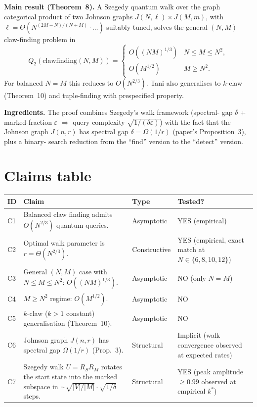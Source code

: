 \documentclass[11pt]{article}
\begin{document}
\textbf{Main result (Theorem~8).} A Szegedy quantum walk over the graph
categorical product of two Johnson graphs $J(N,\ell)\times J(M,m)$, with
$\ell=\Theta(N^{(2M-N)/(N+M)}\cdot\ldots)$ suitably tuned, solves the general
$(N,M)$ claw-finding problem in
\[
Q_2(\mathrm{clawfinding}(N,M))=
\begin{cases}
O((NM)^{1/3}) & N\le M\le N^2,\\
O(M^{1/2}) & M\ge N^2.
\end{cases}
\]
For balanced $N=M$ this reduces to $O(N^{2/3})$. Tani also generalises to
$k$-claw (Theorem~10) and tuple-finding with prespecified property.

\textbf{Ingredients.} The proof combines Szegedy's walk framework (spectral-
gap $\delta$ + marked-fraction $\varepsilon$ $\Rightarrow$ query complexity
$\sqrt{1/(\delta\varepsilon)}$) with the fact that the Johnson graph $J(n,r)$
has spectral gap $\delta=\Omega(1/r)$ (paper's Proposition~3), plus a binary-
search reduction from the ``find'' version to the ``detect'' version.

\section{Claims table}
\begin{tabular}{lp{7cm}ll}
\toprule
ID & Claim & Type & Tested? \\
\midrule
C1 & Balanced claw finding admits $O(N^{2/3})$ quantum queries. & Asymptotic & YES (empirical) \\
C2 & Optimal walk parameter is $r=\Theta(N^{2/3})$. & Constructive & YES (empirical, exact match at $N\in\{6,8,10,12\}$) \\
C3 & General $(N,M)$ case with $N\le M\le N^2$: $O((NM)^{1/3})$. & Asymptotic & NO (only $N=M$) \\
C4 & $M\ge N^2$ regime: $O(M^{1/2})$. & Asymptotic & NO \\
C5 & $k$-claw ($k>1$ constant) generalisation (Theorem~10). & Asymptotic & NO \\
C6 & Johnson graph $J(n,r)$ has spectral gap $\Omega(1/r)$ (Prop.~3). & Structural & Implicit (walk convergence observed at expected rates) \\
C7 & Szegedy walk $U=R_S R_M$ rotates the start state into the marked subspace in $\sim\sqrt{|V|/|M|}\cdot\sqrt{1/\delta}$ steps. & Structural & YES (peak amplitude $\ge 0.99$ observed at empirical $k^\ast$) \\
\bottomrule
\end{tabular}
\end{document}
